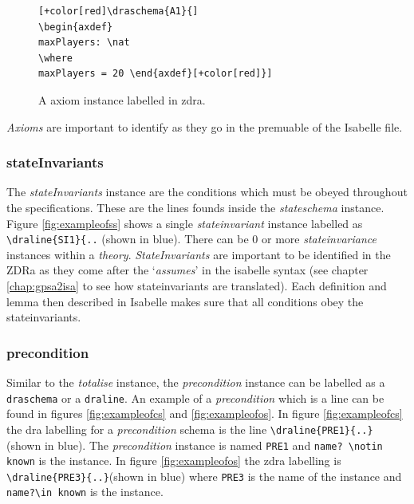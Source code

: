 \begin{figure}[H]
\centering
\begin{footnotesize}
\begin{BVerbatim}[commandchars=+\[\]]
[+color[red]\draschema{A1}{]
\begin{axdef}
maxPlayers: \nat
\where
maxPlayers = 20 \end{axdef}[+color[red]}]
\end{BVerbatim}
\end{footnotesize}
\caption{\label{fig:exampleofa} A axiom instance labelled in \gls{zdra}.}
\end{figure}

\emph{Axioms} are important to identify as they go in the premuable of the
Isabelle file.

\subsubsection{stateInvariants}
The \emph{stateInvariants} instance are the conditions which must be obeyed
throughout the specifications. These are the lines founds inside the
\emph{stateschema} instance. Figure \ref{fig:exampleofss} shows a single
\emph{stateinvariant} instance labelled as \verb|\draline{SI1}{..| (shown in
blue). There can be 0 or more \emph{stateinvariance} instances within a
\emph{theory}. \emph{StateInvariants} are important to be identified in the ZDRa
as they come after the `\emph{assumes}' in the isabelle syntax (see chapter
\ref{chap:gpsa2isa} to see how stateinvariants are translated). Each definition
and lemma then described in Isabelle makes sure that all conditions obey the stateinvariants.

\subsubsection{precondition}

Similar to the \emph{totalise} instance, the \emph{precondition} instance can be
labelled as a \verb|draschema| or a \verb|draline|. An example of a
\emph{precondition} which is a line can be found in figures
\ref{fig:exampleofcs} and \ref{fig:exampleofos}. In figure \ref{fig:exampleofcs}
the \gls{dra} labelling for a \emph{precondition} schema is the line
\verb|\draline{PRE1}{..}| (shown in blue). The \emph{precondition} instance is
named \verb|PRE1| and \verb|name? \notin known| is the instance. In figure
\ref{fig:exampleofos} the \gls{zdra} labelling is 
\verb|\draline{PRE3}{..}|(shown in blue) where \verb|PRE3| is the name of the
instance and 
\verb|name?\in known| is the instance.

